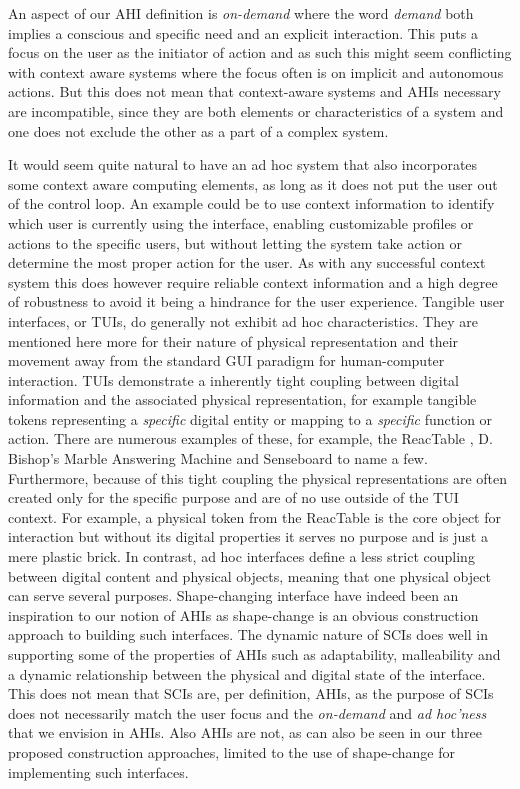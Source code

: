 An aspect of our AHI definition is \emph{on-demand} where the word \emph{demand} both implies a conscious and specific need and an explicit interaction.
This puts a focus on the user as the initiator of action and as such this might seem conflicting with context aware systems where the focus often is on implicit and autonomous actions.
But this does not mean that context-aware systems and AHIs necessary are incompatible, since they are both elements or characteristics of a system and one does not exclude the other as a part of a complex system.

It would seem quite natural to have an ad hoc system that also incorporates some context aware computing elements, as long as it does not put the user out of the control loop.
An example could be to use context information to identify which user is currently using the interface, enabling customizable profiles or actions to the specific users, but without letting the system take action or determine the most proper action for the user.
As with any successful context system this does however require reliable context information and a high degree of robustness to avoid it being a hindrance for the user experience.
\blank
Tangible user interfaces, or TUIs, do generally not exhibit ad hoc characteristics.
They are mentioned here more for their nature of physical representation and their movement away from the standard GUI paradigm for human-computer interaction.
TUIs demonstrate a inherently tight coupling between digital information and the associated physical representation, for example tangible tokens representing a \emph{specific} digital entity or mapping to a \emph{specific} function or action.
There are numerous examples of these, for example, the ReacTable \cite{jorda2007reactable}, D. Bishop's Marble Answering Machine and Senseboard \cite{jacob2002tangible} to name a few.
Furthermore, because of this tight coupling the physical representations are often created only for the specific purpose and are of no use outside of the TUI context. 
For example, a physical token from the ReacTable is the core object for interaction but without its digital properties it serves no purpose and is just a mere plastic brick.
In contrast, ad hoc interfaces define a less strict coupling between digital content and physical objects, meaning that one physical object can serve several purposes.
\blank
Shape-changing interface have indeed been an inspiration to our notion of AHIs as shape-change is an obvious construction approach to building such interfaces.
The dynamic nature of SCIs does well in supporting some of the properties of AHIs such as adaptability, malleability and a dynamic relationship between the physical and digital state of the interface.
This does not mean that SCIs are, per definition, AHIs, as the purpose of SCIs does not necessarily match the user focus and the \emph{on-demand} and \emph{ad hoc'ness} that we envision in AHIs.
Also AHIs are not, as can also be seen in our three proposed construction approaches, limited to the use of shape-change for implementing such interfaces. 


